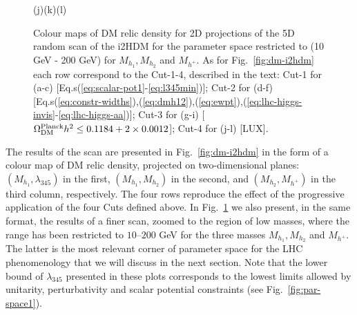 \begin{figure}[htb]
\vskip 0.2cm
\hspace*{1.4cm}(j)\hspace*{0.35\textwidth}\hspace*{-1.5cm}(k)\hspace*{0.35\textwidth}\hspace*{-1.6cm}(l)
\caption{Colour maps of DM relic density for 2D projections of the 5D random scan of the
i2HDM for the parameter space restricted to (10 GeV - 200 GeV) for $M_{h_1},M_{h_2}$ and
$M_{h^{+}}$. As for Fig.~\ref{fig:dm-i2hdm} each row correspond to the Cut-1-4, described in the text: Cut-1 for (a-c) [Eq.s(\ref{eq:scalar-pot1}-\ref{eq:l345min})]; Cut-2 for (d-f) [Eq.s(\ref{eq:constr-widths}),(\ref{eq:dmh12}),(\ref{eq:ewpt}),(\ref{eq:lhc-higgs-invis}-\ref{eq:lhc-higgs-aa})]; Cut-3 for (g-i) [$\Omega_{\rm DM}^{\rm Planck} h^2 \le 0.1184+2\times 0.0012$]; Cut-4 for (j-l) [LUX].\label{fig:dm-i2hdm-small}}
\end{figure}

The results of the  scan are  presented in Fig.~\ref{fig:dm-i2hdm} in the form of a colour map of
DM relic density, projected on two-dimensional planes: $(M_{h_1},\lambda_{345})$ in the first,
$(M_{h_1},M_{h_2})$ in the second, and $(M_{h_2},M_{h^{+}})$ in the third column, respectively.
The four rows reproduce the effect of the progressive application of the four Cuts defined above.
In Fig.~\ref{fig:dm-i2hdm-small} we also present, in the same format, the results of a finer scan, zoomed to the region of low masses, where the range has been restricted to $10$--$200$ GeV for the three masses $M_{h_1},M_{h_2}$ and $M_{h^{+}}$. The latter is the most relevant corner of parameter space for the LHC phenomenology that we will discuss in the next section. Note that the lower bound of $\lambda_{345}$ presented in these plots corresponds to the lowest limits allowed by unitarity, perturbativity and scalar potential constraints (see Fig.~\ref{fig:par-space1}).

